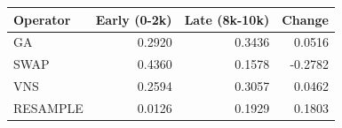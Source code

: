 \begin{tabular}{lrrr}
\toprule
Operator & Early (0-2k) & Late (8k-10k) & Change \\
\midrule
GA & 0.2920 & 0.3436 & 0.0516 \\
SWAP & 0.4360 & 0.1578 & -0.2782 \\
VNS & 0.2594 & 0.3057 & 0.0462 \\
RESAMPLE & 0.0126 & 0.1929 & 0.1803 \\
\bottomrule
\end{tabular}
